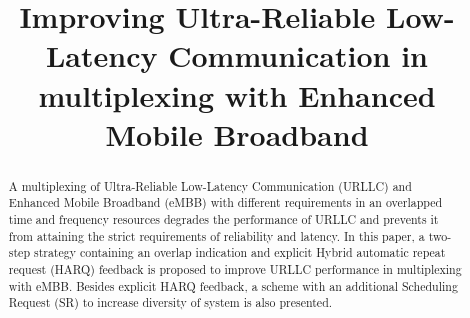 \documentclass[conference]{IEEEtran}
\begin{document}
\title{Improving Ultra-Reliable Low-Latency Communication in multiplexing with Enhanced Mobile Broadband\\
}

\author{
\and
{}
}

\maketitle

\begin{abstract}
A multiplexing of Ultra-Reliable Low-Latency Communication (URLLC) and Enhanced Mobile Broadband (eMBB) with different requirements in an overlapped time and frequency resources degrades the performance of URLLC and prevents it from attaining the strict requirements of reliability and latency. In this paper, a two-step strategy containing an overlap indication and explicit Hybrid automatic repeat request (HARQ) feedback is proposed to improve URLLC performance in multiplexing with eMBB. Besides explicit HARQ feedback, a scheme with an additional Scheduling Request (SR) to increase diversity of system is also presented.

\end{abstract}
\end{document}
